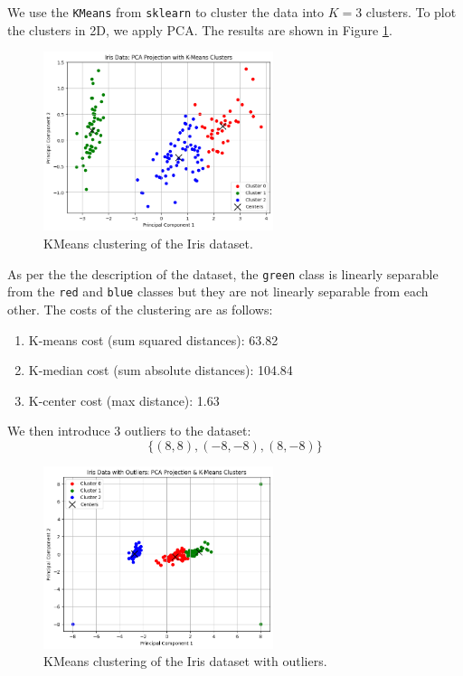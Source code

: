 \documentclass{article}
\begin{document}
We use the \texttt{KMeans} from \texttt{sklearn} to cluster the data into $K=3$ clusters. To plot the clusters in 2D, we apply PCA. The results are shown in Figure \ref{fig:kmeans}.
\begin{figure}[ht]
    \centering
    \includegraphics[width=0.6\textwidth]{knn-iris.png}
    \caption{KMeans clustering of the Iris dataset.}
    \label{fig:kmeans}
\end{figure}
As per the the description of the dataset, the \texttt{green} class is linearly separable from the \texttt{red} and \texttt{blue} classes but they are not linearly separable from each other.
\newpage
\noindent The costs of the clustering are as follows:
\begin{enumerate}
    \itemsep 0em
    \item K-means cost (sum squared distances): 63.82
    \item K-median cost (sum absolute distances): 104.84
    \item K-center cost (max distance): 1.63
\end{enumerate}
We then introduce 3 outliers to the dataset:
\[
\{
    (8,8), (-8,-8), (8, -8)
\}
\]
\begin{figure}[ht]
    \centering
    \includegraphics[width=0.6\textwidth]{knn-iris-out.png}
    \caption{KMeans clustering of the Iris dataset with outliers.}
    \label{fig:kmeans-outliers}
\end{figure}
\end{document}
